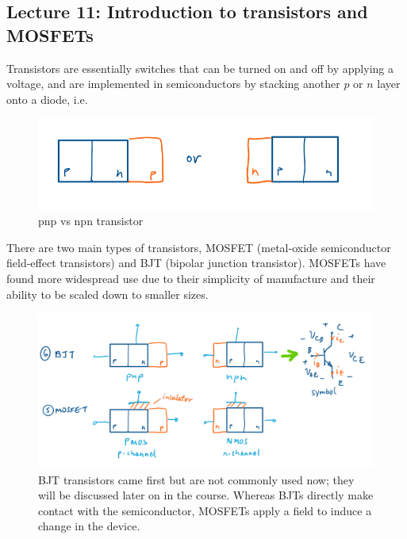 \documentclass[../notes.tex]{subfiles}
\begin{document}
\subsection{Lecture 11: Introduction to transistors and MOSFETs}

Transistors are essentially switches that can be turned on and off by applying a voltage, and are implemented in semiconductors by stacking another $ p $ or $ n $ layer onto a diode, i.e.

\begin{figure}[H]
	\centering
	\includegraphics[width=0.8\linewidth]{img/image_2022-10-20-00-21-48.png}
	\caption{pnp vs npn transistor}
\end{figure}





There are two main types of transistors, MOSFET (metal-oxide semiconductor field-effect transistors) and BJT (bipolar junction transistor).
MOSFETs have found more widespread use due to their simplicity of manufacture and their ability to be scaled down to smaller sizes.




\begin{figure}[H]
	\centering
	\includegraphics[width=0.8\linewidth]{img/image_2022-10-20-00-24-31.png}
	\caption{BJT transistors came first but are not commonly used now; they will be discussed later on in the course. Whereas BJTs directly make contact with the semiconductor, MOSFETs apply a field to induce a change in the device.}
\end{figure}
\end{document}
